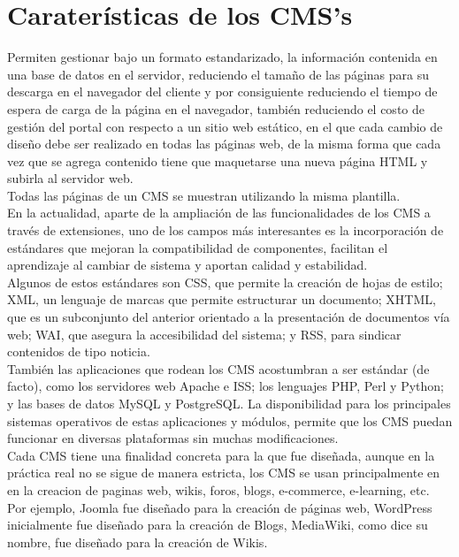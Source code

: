 \section{Carater\'isticas de los CMS's}
Permiten gestionar bajo un formato estandarizado, la informaci\'on contenida en una base de datos en el servidor, reduciendo el tama\~no de las p\'aginas para su descarga en el navegador del cliente y por consiguiente reduciendo el tiempo de espera de carga de la p\'agina en el navegador, tambi\'en reduciendo el costo de gesti\'on del portal con respecto a un sitio web est\'atico, en el que cada cambio de dise\~no debe ser realizado en todas las p\'aginas web, de la misma forma que cada vez que se agrega contenido tiene que maquetarse una nueva p\'agina HTML y subirla al servidor web.\\
Todas las p\'aginas de un CMS se muestran utilizando la misma plantilla.\\
En la actualidad, aparte de la ampliaci\'on de las funcionalidades de los CMS a trav\'es de extensiones, uno de los campos m\'as interesantes es la incorporaci\'on de est\'andares que mejoran la compatibilidad de componentes, facilitan el aprendizaje al cambiar de sistema y aportan calidad y estabilidad.\\
Algunos de estos est\'andares son CSS, que permite la creaci\'on de hojas de estilo; XML, un lenguaje de marcas que permite estructurar un documento; XHTML, que es un subconjunto del anterior orientado a la presentaci\'on de documentos v\'ia web; WAI, que asegura la accesibilidad del sistema; y RSS, para sindicar contenidos de tipo noticia.\\
Tambi\'en las aplicaciones que rodean los CMS acostumbran a ser est\'andar (de facto), como los servidores web Apache e ISS; los lenguajes PHP, Perl y Python; y las bases de datos MySQL y PostgreSQL. La disponibilidad para los principales sistemas operativos de estas aplicaciones y m\'odulos, permite que los CMS puedan funcionar en diversas plataformas sin muchas modificaciones.\\
Cada CMS tiene una finalidad concreta para la que fue dise\~nada, aunque en la pr\'actica real no se sigue de manera estricta, los CMS se usan principalmente en en la creacion de paginas web, wikis, foros, blogs, e-commerce, e-learning, etc.\\
Por ejemplo, Joomla fue dise\~nado para la creaci\'on de p\'aginas web, WordPress inicialmente fue dise\~nado para la creaci\'on de Blogs, MediaWiki, como dice su nombre, fue dise\~nado para la creaci\'on de Wikis.

